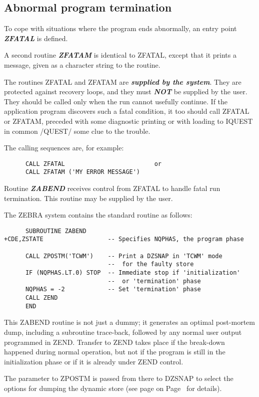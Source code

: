 \subsection{Abnormal program termination}
\par To cope with situations where the program ends abnormally,
an entry point {\bf\it ZFATAL} is defined.
\par A second routine {\bf\it ZFATAM} is identical to ZFATAL,
except that it prints a message,
given as a character string to the routine.
\par The routines ZFATAL and ZFATAM are {\bf\it supplied by the system}.
They are protected against recovery loops, and they must
{\bf\it NOT} be supplied by the user.
They should be called only when the run cannot usefully continue.
If the application program discovers such a fatal condition,
it too should call ZFATAL or ZFATAM,
preceded with some diagnostic printing or
with loading to IQUEST in common /QUEST/ some clue to the trouble.
\par The calling sequences are, for example:
\begin{verbatim}
      CALL ZFATAL                         or
      CALL ZFATAM ('MY ERROR MESSAGE')
\end{verbatim}
\par Routine {\bf\it ZABEND}
receives control from ZFATAL to handle fatal run termination.
This routine may be supplied by the user.
\par The ZEBRA system contains the standard routine as follows:
\begin{verbatim}
      SUBROUTINE ZABEND
+CDE,ZSTATE                  -- Specifies NQPHAS, the program phase
 
      CALL ZPOSTM('TCWM')    -- Print a DZSNAP in 'TCWM' mode
                             --  for the faulty store
      IF (NQPHAS.LT.0) STOP  -- Immediate stop if 'initialization'
                             --  or 'termination' phase
      NQPHAS = -2            -- Set 'termination' phase
      CALL ZEND
      END
\end{verbatim}
\par This ZABEND routine is not just a dummy; it generates
an optimal post-mortem
dump, including a subroutine trace-back, followed by any normal
user output programmed in ZEND. Transfer to ZEND takes place if
the break-down happened during normal operation, but not if the
program is still in the initialization phase or if it is already under
ZEND control.
\par The parameter to ZPOSTM is passed from there to DZSNAP to select the
options for dumping the dynamic store
(see page on Page~\pageref{DZSNAP FORM=PAGEONLY}
for details).
